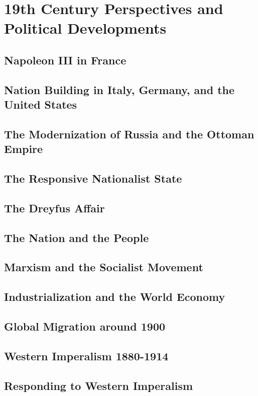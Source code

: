 \documentclass[../euro.tex]{subfiles}
\begin{document}
\chapter{19th Century Perspectives and Political Developments}
\section{Napoleon III in France}
\section{Nation Building in Italy, Germany, and the United States}
\section{The Modernization of Russia and the Ottoman Empire}
\section{The Responsive Nationalist State}
\section{The Dreyfus Affair}
\section{The Nation and the People}
\section{Marxism and the Socialist Movement}
\section{Industrialization and the World Economy}
\section{Global Migration around 1900}
\section{Western Imperalism 1880-1914}
\section{Responding to Western Imperalism}
\end{document}
